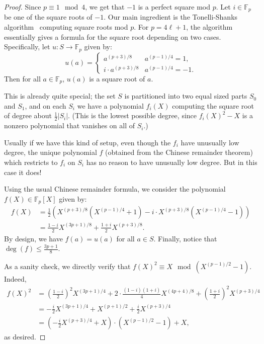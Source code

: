 \documentclass[10pt,a4paper]{article}
\newcommand{\F}{\mathbb{F}}
\begin{document}
\begin{proof}
Since $p \equiv 1 \mod 4$, we get that $-1$ is a perfect square mod $p$. Let $i \in \F_p$ be one of the square roots of $-1$.
Our main ingredient is the Tonelli-Shanks algorithm~\cite{ShanksTonelli1,ShanksTonelli2} computing square roots mod $p$. For $p = 4 \ell + 1$, the algorithm essentially gives a formula for the square root depending on two cases.
Specifically, let $u: S \to \F_p$ given by:
$$ u(a) = \begin{cases} 
            a^{(p + 3)/8} & a^{(p-1)/4} = 1, \\
            i \cdot a^{(p + 3)/8} & a^{(p-1)/4} = -1.
          \end{cases}$$
Then for all $a \in \F_p$, $u(a)$ is a square root of $a$.

This is already quite special; the set $S$ is partitioned into two equal sized parts $S_0$ and $S_1$, and on each $S_i$ we have a polynomial $f_i(X)$ computing the square root of degree about $\frac{1}{2} |S_i|$. (This is the lowest possible degree, since $f_i(X)^2 - X$ is a nonzero polynomial that vanishes on all of $S_i$.)

Usually if we have this kind of setup, even though the $f_i$ have unusually low degree, the unique polynomial $f$ (obtained from the Chinese remainder theorem) which restricts to $f_i$ on $S_i$ has no reason to have unusually low degree. 
But in this case it does!

Using the usual Chinese remainder formula, we consider the polynomial $f(X) \in \F_p[X]$ given by:
\begin{align*}
 f(X) &= \frac{1}{2} \left( X^{(p+3)/8} (X^{(p-1)/4} + 1) - i \cdot X^{(p+3)/8} (X^{(p-1)/4} - 1)  \right) \\
 &= \frac{1-i}{2}  X^{(3p+1)/8} + \frac{1+i}{2} X^{(p+3)/8}.
\end{align*}
By design, we have $f(a) = u(a)$ for all $a \in S$. 
Finally, notice that $\deg(f) \leq \frac{3p+1}{8}$. 

As a sanity check, we directly verify that $f(X)^2 \equiv X \mod (X^{(p-1)/2} -1)$.
Indeed,
\begin{align*}
f(X)^2 &=  \left(\frac{1-i}{2} \right)^2 X^{(3p+1)/4} + 2 \cdot \frac{(1-i)(1+i)}{4} X^{(4p+4)/8} + \left(\frac{1+i}{2} \right)^2 X^{(p+3)/4}\\
&= -\frac{i}{2} X^{(3p+1)/4} + X^{(p+1)/2} + \frac{i}{2} X^{(p+3)/4}\\
&=   \left(-\frac{i}{2} X^{(p+3)/4} +  X\right) \cdot (X^{(p-1)/2} - 1) + X,
\end{align*}
as desired.
\end{proof}
\end{document}
